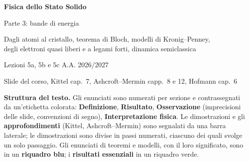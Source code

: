 \documentclass[11pt,a4paper]{article}
\newcommand{\corso}{Fisica dello Stato Solido}
\newcommand{\argomento}{Parte 3: bande di energia}
\newcommand{\lezioni}{Lezioni 5a, 5b e 5c}
\begin{document}
\hypersetup{pageanchor=false}
\begin{titlepage}
\centering
\vspace*{5.2cm}
{\fontsize{24}{30}\selectfont\bfseries \corso\par}
\vspace{1.1cm}
{\Large \argomento\par}
\vspace{0.9cm}
{\large Dagli atomi al cristallo, teorema di Bloch, modelli di Kronig--Penney,\\ degli elettroni quasi liberi e a legami forti, dinamica semiclassica\par}
\vspace{0.35cm}
{\color{black!60} \lezioni{} \textperiodcentered{} A.A. 2026/2027\par}
\vspace{0.2cm}
{\small\color{black!60} Slide del corso, Kittel cap.~7, Ashcroft--Mermin capp.~8 e 12, Hofmann cap.~6\par}
\vspace{2.6cm}
\begin{minipage}{0.86\linewidth}\small\setlength{\parskip}{0pt}
\textbf{Struttura del testo.} Gli enunciati sono numerati per sezione e contrassegnati da
un'etichetta colorata: \textbf{\color{cdef}Definizione}, \textbf{\color{cris}Risultato},
\textbf{\color{coss}Osservazione} (imprecisioni delle slide,
convenzioni di segno), \textbf{\color{cint}Interpretazione fisica}. Le dimostrazioni e gli
\textbf{\color{cappr}approfondimenti} (Kittel, Ashcroft--Mermin) sono segnalati da una barra
laterale; le dimostrazioni sono divise in passi numerati, ciascuno dei quali svolge un solo
passaggio. Gli enunciati di teoremi e modelli, con il loro significato, sono in un
\textbf{\color{csez}riquadro blu}; i \textbf{\color{cris}risultati essenziali} in un riquadro verde.
\end{minipage}
\vfill
\end{titlepage}
\hypersetup{pageanchor=true}

\tableofcontents
\newpage
\end{document}
